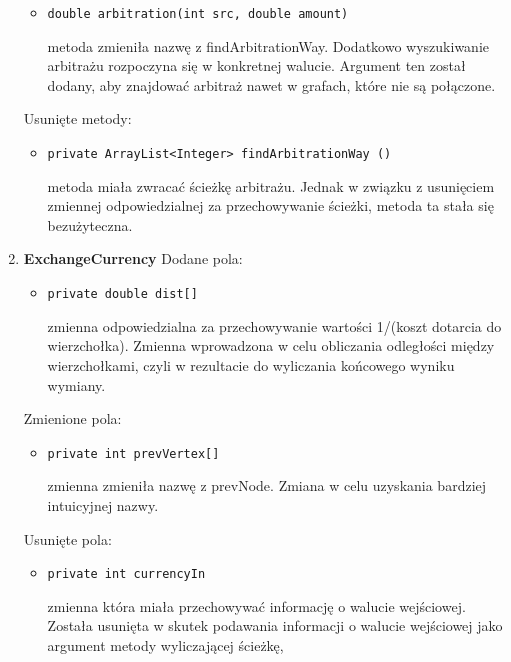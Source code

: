 \documentclass[12pt]{article}
\begin{document}
\begin{enumerate}
\begin{itemize}
     \item \begin{verbatim}double arbitration(int src, double amount)\end{verbatim}
        metoda zmieniła nazwę z findArbitrationWay. Dodatkowo wyszukiwanie arbitrażu rozpoczyna się w konkretnej walucie. Argument ten został dodany, aby znajdować arbitraż nawet w grafach, które nie są połączone.
    \end{itemize}
    Usunięte metody:
    \begin{itemize}
     \item \begin{verbatim}private ArrayList<Integer> findArbitrationWay ()\end{verbatim}
        metoda miała zwracać ścieżkę arbitrażu. Jednak w związku z usunięciem zmiennej odpowiedzialnej za przechowywanie ścieżki, metoda ta stała się bezużyteczna.
    \end{itemize}
\item \textbf{ExchangeCurrency}
\newline\newline
   Dodane pola:
    \begin{itemize}
        \item \begin{verbatim}private double dist[]\end{verbatim}
        zmienna odpowiedzialna za przechowywanie wartości 1/(koszt dotarcia do wierzchołka). Zmienna wprowadzona w celu obliczania odległości między wierzchołkami, czyli w rezultacie do wyliczania końcowego wyniku wymiany.
    \end{itemize}
    Zmienione pola:
    \begin{itemize}
    \item \begin{verbatim}private int prevVertex[]\end{verbatim}
        zmienna zmieniła nazwę z prevNode. Zmiana w celu uzyskania bardziej intuicyjnej nazwy.
    \end{itemize}
    Usunięte pola:
     \begin{itemize}
     \item \begin{verbatim}private int currencyIn\end{verbatim}
        zmienna która miała przechowywać informację o walucie wejściowej. Została usunięta w skutek podawania informacji o walucie wejściowej jako argument metody wyliczającej ścieżkę,
    \end{itemize}

\end{enumerate}
\end{document}
